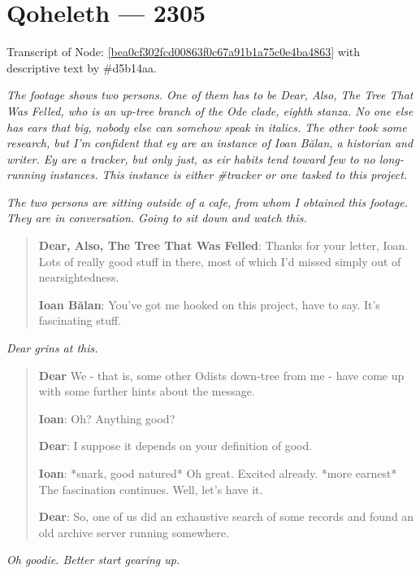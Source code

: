 \hypertarget{qoheleth-2305}{%
\chapter*{Qoheleth — 2305}\label{qoheleth-2305}}

Transcript of Node: \href{http://35.165.134.227/node/bea0cf302fcd00863f0c67a91b1a75c0e4ba4863}{{[}bea0cf302fcd00863f0c67a91b1a75c0e4ba4863{]}} with descriptive text by \#d5b14aa.

\emph{The footage shows two persons. One of them has to be Dear, Also, The Tree That Was Felled, who is an up-tree branch of the Ode clade, eighth stanza. No one else has ears that big, nobody else can somehow speak in italics. The other took some research, but I'm confident that ey are an instance of Ioan Bălan, a historian and writer. Ey are a tracker, but only just, as eir habits tend toward few to no long-running instances. This instance is either \#tracker or one tasked to this project.}

\emph{The two persons are sitting outside of a cafe, from whom I obtained this footage. They are in conversation. Going to sit down and watch this.}

\begin{quote}
\textbf{Dear, Also, The Tree That Was Felled}: Thanks for your letter, Ioan. Lots of really good stuff in there, most of which I'd missed simply out of nearsightedness.

\textbf{Ioan Bălan}: You've got me hooked on this project, have to say. It's fascinating stuff.
\end{quote}

\emph{Dear grins at this.}

\begin{quote}
\textbf{Dear} We - that is, some other Odists down-tree from me - have come up with some further hints about the message.

\textbf{Ioan}: Oh? Anything good?

\textbf{Dear}: I suppose it depends on your definition of good.

\textbf{Ioan}: *snark, good natured* Oh great. Excited already. *more earnest* The fascination continues. Well, let's have it.

\textbf{Dear}: So, one of us did an exhaustive search of some records and found an old archive server running somewhere.
\end{quote}

\emph{Oh goodie. Better start gearing up.}


